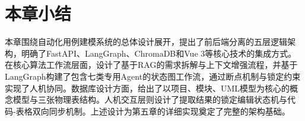 \section{本章小结}

本章围绕自动化用例建模系统的总体设计展开，提出了前后端分离的五层逻辑架构，明确了FastAPI、LangGraph、ChromaDB和Vue 3等核心技术的集成方式。在核心算法工作流层面，设计了基于RAG的需求拆解与上下文增强流程，并基于LangGraph构建了包含七类专用Agent的状态图工作流，通过断点机制与锁定约束实现了人机协同。数据库设计方面，给出了以项目、模块、UML模型为核心的概念模型与三张物理表结构。人机交互层则设计了提取结果的锁定编辑状态机与代码-表格双向同步机制。上述设计为第五章的详细实现奠定了完整的架构基础。